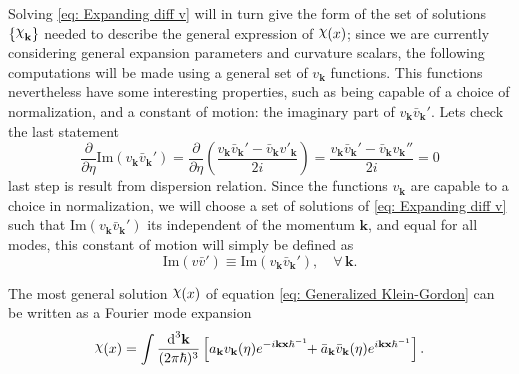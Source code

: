 Solving \cref{eq: Expanding diff v} will in turn give the form of the set of solutions $\left\{\rchi_{\mathbf{k}}\right\}$ needed to describe the general expression of $\rchi(x)$; since we are currently considering general expansion parameters and curvature scalars, the following computations will be made using a general set of $v_\mathbf{k}$ functions. This functions nevertheless have some interesting properties, such as being capable of a choice of normalization, and a constant of motion: the imaginary part of $v_\mathbf{k}\bar{v}_\mathbf{k}'$. Lets check the last statement
\begin{equation}
	\frac{\partial}{\partial \eta }\text{Im}(v_\mathbf{k}\bar{v}_\mathbf{k}')=\frac{\partial}{\partial \eta}\left(\frac{v_\mathbf{k}\bar{v}_\mathbf{k}'-\bar v_\mathbf{k}v'_\mathbf{k}}{2i}\right)=\frac{v_\mathbf{k}\bar v_\mathbf{k}'-\bar v_\mathbf{k}v_\mathbf{k}''}{2i}=0
\end{equation}
last step is result from dispersion relation. Since the functions $v_\mathbf{k}$ are capable to a choice in normalization, we will choose a set of solutions of \cref{eq: Expanding diff v} such that $\text{Im}(v_\mathbf{k}\bar{v}_\mathbf{k}')$ its independent of the momentum $\mathbf{k}$, and equal for all modes, this constant of motion will simply be defined as
\begin{equation}
	\text{Im}(v\bar{v}')\equiv \text{Im}(v_\mathbf{k}\bar{v}_\mathbf{k}'),\quad \forall\,\mathbf{k}.
\end{equation}

The most general solution $\rchi(x)$ of equation \cref{eq: Generalized Klein-Gordon} can be written as a Fourier mode expansion
\begin{equation}\label{eq: Expanding General Solution}
	\rchi(x)=\int\frac{\td^3\mathbf{k}}{(2\pi\hbar)^3}\left[a_\mathbf{k}v_\mathbf{k}(\eta)e^{-i\mathbf{kx}\hbar^{-1}}\!\!+\bar a_\mathbf{k}\bar v_\mathbf{k}(\eta)e^{i\mathbf{kx}\hbar^{-1}}\right].
\end{equation}


